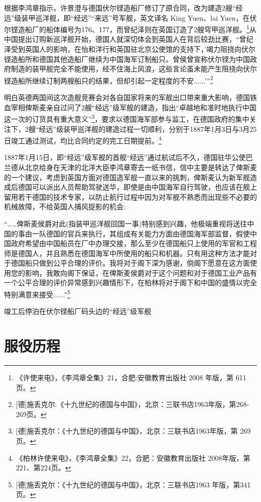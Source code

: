 \documentclass[12pt,UTF8]{ctexbook}
\begin{document}
根据李鸿章指示，许景澄与德国伏尔铿造船厂修订了原合同，改为建造2艘“经远”级装甲巡洋舰，即“经远”“来远”号军舰，英文译名 King Yuen、lai Yuen，在伏尔铿造船厂的船体编号为176、177，而曾纪泽则在英国订造了2艘穹甲巡洋舰。\footnote{《许使来电》，《李鸿章全集》21，合肥:安徽教育出版社 2008 年版，第 611页。}从中国提出订购新巡洋舰开始，德国人就深切体会到英国人在背后较劲比赛，“曾纪泽受到英国人的影响，在怡和洋行和英国驻北京公使馆的支持下，'竭力阻挠向伏尔铿造船所和德国其他造船厂继续为中国海军订制船只。曾侯曾宣称伏尔铿为中国政府制造的装甲舰完全不能使用，经不住海上风浪，这些言论虽未能产生阻挠向伏尔铿造船所继续订制两艘船只的结果，但却引起一定程度的不安......’”\footnote{[德]施丢克尔:《十九世纪的德国与中国》，北京：三联书店1963年版，第268-269页。}

明白英德两国间这次造舰竞赛会对各自国家将来的军舰出口带来重大影响，德国铁血宰相俾斯麦亲自过问了2艘“经远”级军舰的建造，指出“卓越地和准时地执行中国这一次的订货具有重大意义”\footnote{[德]施丢克尔：《十九世纪的德国与中国》，北京：三联书店1963年版，第 269页。}，要求以德国海军部参与监工，在德国政府的集中关注下，2艘“经远”级装甲巡洋舰的建造过程一切顺利，分别于1887年1月3日与3月25日竣工通过测试，均比合同约定的完工日期提前。\footnote{《柏林许使来电》，《李鸿章全集》22，合肥：安徽教育出版社 2008年版，第221、第224页。}

1887年1月15日，即“经远”级军舰的首舰“经远”通过航试后不久，德国驻华公使巴兰德从北京给身在天津的北洋大臣李鸿章寄去一纸书信，信中主要是转达了俾斯麦的一个建议，考虑到英国方面对德国造军舰一直以来的挑刺，俾斯麦认为新军舰造成后德国可以派出人员帮助驾驶送华，即使是由中国海军自行驾驶，也应该在舰上留用若干德国的技术专家，以防止航行过程中因为对军舰不熟悉而出现些不必要的机械故障，不给英国人捕风捉影的机会:

“……俾斯麦侯爵对此(指装甲巡洋舰回国一事)特别感到兴趣，他极端重视将送往中国的事由一队德国的官兵来执行，其组成有关能力方面由德国海军部监督，假使中国政府希望由中国船员在厂中办理交接，那么至少在德国船只上使用的军官和工程师是德国人，并且熟悉在德国海军中所使用的船只和机器。只有用这种方法才能对于德国船只做到公平合理的评价。我将对于阁下深为感谢，倘阁下愿意在这方面使用您的影响，我敢向阁下保证，在俾斯麦侯爵对于这个问题和对于德国工业产品有一个公平合理的评价异常感到兴趣情形下，在柏林将对于阁下和中国的盛情以完全特别满意来接受......”\footnote{[德]施丢克尔：《十九世纪的德国与中国》，北京：三联书店1963 年版，第341页。}

竣工后停泊在伏尔铿船厂码头边的“经远”级军舰

\section{服役历程}
\end{document}
